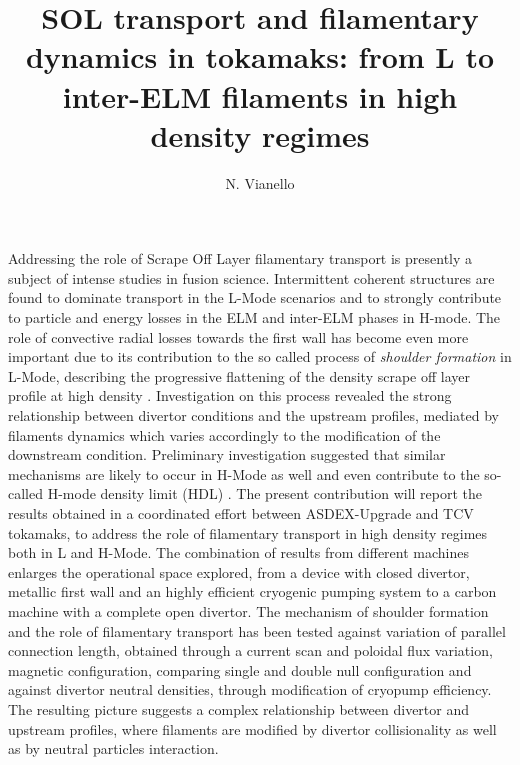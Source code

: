 \documentclass{epsconf}
\title{SOL transport and filamentary dynamics in tokamaks: from L to
  inter-ELM filaments in high density regimes}
\author{N. Vianello}
\institute{Consorzio RFX (CNR, ENEA, INFN, Universit{\'a} di Padova, Acciaierie Venete SpA), C.so Stati Uniti 4, 35127, Padova, Italy}
\begin{document}
\maketitle
Addressing the role of Scrape Off Layer filamentary transport is
presently a subject of intense studies in fusion science. 
Intermittent coherent structures are found to dominate transport in
the L-Mode scenarios and to strongly contribute to particle
and energy losses in the ELM and inter-ELM phases in H-mode.
The role of convective radial losses towards the first
wall has become even more important due to its 
contribution 
to the so called process of \emph{shoulder formation} in
L-Mode, describing the progressive flattening of the density
scrape off layer profile at high density
\cite{LaBombard:2001ks,Carralero:2015gu,Militello:2016hk,Vianello:2017ku}.
Investigation on this process revealed the strong
relationship between divertor conditions and the upstream profiles,
mediated by filaments dynamics which varies
accordingly to the modification of the downstream condition.
Preliminary investigation suggested that similar mechanisms are likely to
occur in H-Mode as well \cite{Carralero:2017gb} and even contribute to
the so-called H-mode density limit (HDL) \cite{bernert2014h}.  
The present contribution will report the results obtained in a
coordinated effort between ASDEX-Upgrade and TCV tokamaks, to address
the role of filamentary transport in high density regimes both in L
and H-Mode. The combination 
of results from different machines enlarges the operational
space explored, from a device with closed divertor, metallic
first wall and an highly efficient cryogenic pumping system to a carbon
machine with a complete open divertor.
The mechanism of shoulder formation and the role of filamentary
transport has been tested against variation of parallel connection
length, obtained through a current scan and poloidal flux variation,
magnetic configuration, comparing single and double null configuration
and against divertor neutral densities, through modification of
cryopump efficiency. The resulting picture suggests a complex
relationship between divertor and upstream profiles, where filaments
are modified by divertor collisionality as well as by neutral particles
interaction.

\begingroup
{}
\printbibliography
\endgroup
\end{document}
